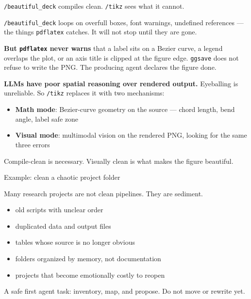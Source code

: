 \documentclass[aspectratio=169,11pt]{beamer}
\begin{document}
\begin{frame}{\texttt{/beautiful\_deck} compiles clean. \texttt{/tikz} sees what it cannot.}

\texttt{/beautiful\_deck} loops on overfull boxes, font warnings, undefined references --- the things \texttt{pdflatex} catches. It will not stop until they are gone.

\vspace{0.25cm}

\textbf{But \texttt{pdflatex} never warns} that a label sits on a Bezier curve, a legend overlaps the plot, or an axis title is clipped at the figure edge. \texttt{ggsave} does not refuse to write the PNG. The producing agent declares the figure done.

\vspace{0.2cm}

\textbf{LLMs have poor spatial reasoning over rendered output.} Eyeballing is unreliable. So \texttt{/tikz} replaces it with two mechanisms:

\begin{itemize}\setlength\itemsep{0.1em}
    \item \textbf{Math mode}: Bezier-curve geometry on the source --- chord length, bend angle, label safe zone
    \item \textbf{Visual mode}: multimodal vision on the rendered PNG, looking for the same three errors
\end{itemize}

\vspace{0.2cm}

\alert{Compile-clean is necessary. Visually clean is what makes the figure beautiful.}

\end{frame}

\begin{frame}{Example: clean a chaotic project folder}

Many research projects are not clean pipelines. They are sediment.

\vspace{0.25cm}

\begin{itemize}\setlength\itemsep{0.3em}
    \item old scripts with unclear order
    \item duplicated data and output files
    \item tables whose source is no longer obvious
    \item folders organized by memory, not documentation
    \item projects that become emotionally costly to reopen
\end{itemize}

\vspace{0.35cm}

\alert{A safe first agent task: inventory, map, and propose. Do not move or rewrite yet.}

\end{frame}
\end{document}
